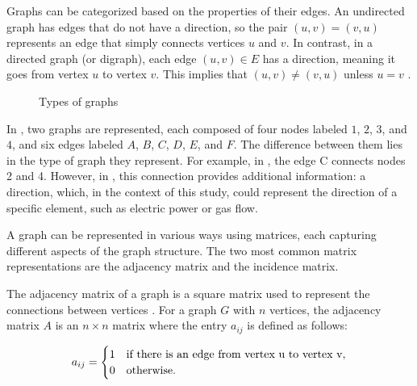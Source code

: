 Graphs can be categorized based on the properties of their edges. An undirected graph has edges that do not have a direction, so the pair $(u, v) = (v, u)$ represents an edge that simply connects vertices $u$ and $v$. In contrast, in a directed graph (or digraph), each edge $(u, v) \in E$ has a direction, meaning it goes from vertex $u$ to vertex $v$. This implies that $(u, v) \neq (v, u)$ unless $u = v$ \cite{Bender_Williamson_2010}.

\begin{figure}[h]
    \centering
        \setlength{}        
        \setlength{} 
    \caption{Types of graphs}\label{fig:graph_definition}
\end{figure}

In , two graphs are represented, each composed of four nodes labeled $1$, $2$, $3$, and $4$, and six edges labeled $A$, $B$, $C$, $D$, $E$, and $F$. The difference between them lies in the type of graph they represent. For example, in , the edge C connects nodes 2 and 4. However, in , this connection provides additional information: a direction, which, in the context of this study, could represent the direction of a specific element, such as electric power or gas flow.


A graph can be represented in various ways using matrices, each capturing different aspects of the graph structure. The two most common matrix representations are the adjacency matrix and the incidence matrix.

The adjacency matrix of a graph is a square matrix used to represent the connections between vertices \cite{wilson_1972}. For a graph $G$ with $n$ vertices, the adjacency matrix $A$ is an $n \times n$ matrix where the entry $a_{ij}$ is defined as follows:

\begin{equation}
 a_{ij} = 
\begin{cases}
1 & \text{if there is an edge from vertex } $u$ \text{ to vertex } $v$, \\
0 & \text{otherwise}.
\end{cases}
    \label{eq:adjacency_matrix_definition}
\end{equation}


